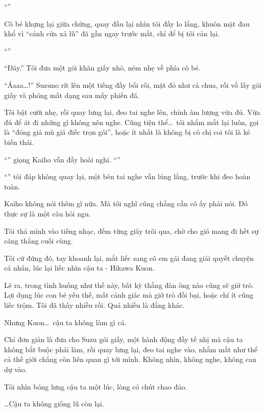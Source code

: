 \documentclass[../main.tex]{subfiles}
\begin{document}
``\textbf{}''

Cô bé khựng lại giữa chừng, quay đầu lại nhìn tôi đầy lo lắng, khuôn mặt đau khổ vì ``cánh cửa xả lũ'' đã gần ngay trước mắt, chỉ để bị tôi cản lại.

``''

``Đây.'' Tôi đưa một gói khăn giấy nhỏ, ném nhẹ về phía cô bé.

``Áaaa\dots!'' Suzuno rít lên một tiếng đầy bối rối, mặt đỏ như cà chua, rồi vồ lấy gói giấy và phóng mất dạng sau mấy phiến đá.

Tôi bật cười nhẹ, rồi quay lưng lại, đeo tai nghe lên, chỉnh âm lượng vừa đủ. Vừa đủ để át đi những gì không nên nghe. Cũng tiện thể\dots\ tôi nhắm mắt lại luôn, gọi là ``đóng giả mù giả điếc trọn gói'', hoặc ít nhất là không bị cô chị coi tôi là kẻ biến thái.

``'' giọng Kaiho vẫn đầy hoài nghi. ``''

``'' tôi đáp không quay lại, một bên tai nghe vẫn lủng lẳng, trước khi đeo hoàn toàn.

Kaiho không nói thêm gì nữa. Mà tôi nghĩ cũng chẳng cần cô ấy phải nói. Đó thực sự là một câu hỏi ngu.

Tôi thả mình vào tiếng nhạc, đếm từng giây trôi qua, chờ cho gió mang đi hết sự căng thẳng cuối cùng.


Tôi cứ đứng đó, tay khoanh lại, mắt liếc sang cô em gái đang giải quyết chuyện cá nhân, lúc lại liếc nhìn cậu ta - Hikawa Kuon.

Lẽ ra, trong tình huống như thế này, bất kỳ thằng đàn ông nào cũng sẽ giở trò. Lợi dụng lúc con bé yếu thế, mất cảnh giác mà giở trò đồi bại, hoặc chí ít cũng liếc trộm. Tôi đã thấy nhiều rồi. Quá nhiều là đằng khác.

Nhưng Kuon\dots\ cậu ta không làm gì cả.

Chỉ đơn giản là đưa cho Suzu gói giấy, một hành động đầy tế nhị mà cậu ta không bắt buộc phải làm, rồi quay lưng lại, đeo tai nghe vào, nhắm mắt như thể cả thế giới chẳng còn liên quan gì tới mình. Không nhìn, không nghe, không can dự vào.

Tôi nhìn bóng lưng cậu ta một lúc, lòng có chút chao đảo.

\dots Cậu ta không giống lũ còn lại.
\end{document}
